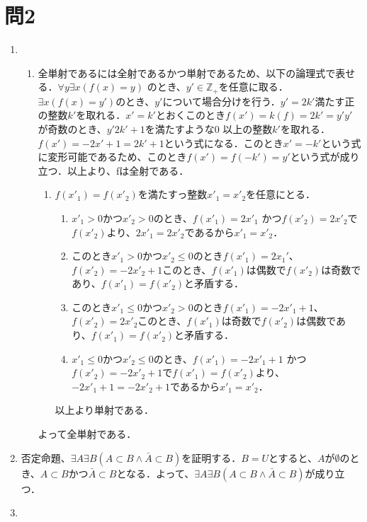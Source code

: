 \documentclass[uplatex]{jsarticle}
\begin{document}
\section{問2}
\begin{enumerate}
	\item 
		\begin{enumerate}
			\item 全単射であるには全射であるかつ単射であるため、以下の論理式で表せる．$\forall y \exists x ( f(x) = y)$ のとき、$y' \in \mathbb{Z}_+$を任意に取る．$\exists x (f(x) = y') $のとき、$y'$について場合分けを行う．$y' = 2k'$満たす正の整数$k'$を取れる．$x' = k'$とおくこのとき$f(x') = k(f) =  2k'= y'$$y'$が奇数のとき、$y' 2k' + 1 $を満たすような0 以上の整数$k'$を取れる．$f(x') = -2x' + 1 = 2k' + 1$という式になる．このとき$x' = -k'$という式に変形可能であるため、このとき$f(x') = f(-k') = y'$という式が成り立つ．以上より、fは全射である．
			\begin{enumerate}
				\item $f(x'_1) = f(x'_2)$を満たすっ整数$x'_1 = x'_2$を任意にとる．
					\begin{enumerate}
						\item $x'_1 > 0$かつ$x'_2>0$のとき、$f(x'_1) = 2x'_1$ かつ$f(x'_2) = 2x'_2$で$f(x'_2)$より、$2x'_1=2x'_2$であるから$x'_1 = x'_2$．
						\item このとき$x'_1 > 0 $かつ$x'_2 \le 0$のとき$f(x'_1) = 2x_1'$、$f(x'_2) = -2x'_2 + 1$このとき、$f(x'_1)$は偶数で$f(x'_2)$は奇数であり、$f(x'_1) = f(x'_2)$と矛盾する．
						\item このとき$x'_1 \le 0 $かつ$x'_2 > 0$のとき$f(x'_1) = -2x'_1 + 1$、$f(x'_2) = 2x'_2$このとき、$f(x'_1)$は奇数で$f(x'_2)$は偶数であり、$f(x'_1) = f(x'_2)$と矛盾する．
						\item $x'_1 \le 0$かつ$x'_2\le0$のとき、$f(x'_1) = -2x'_1 + 1$ かつ$f(x'_2) = -2x'_2 + 1$で$f(x'_1) = f(x'_2)$より、$-2x'_1 + 1 = -2x'_2 + 1$であるから$x'_1 = x'_2$．
					\end{enumerate}
				以上より単射である．
			\end{enumerate}
			よって全単射である．
		\end{enumerate}
	\item 否定命題、$\exists A \exists B(A \subset B \land \bar{A} \subset B)$を証明する．$B = U$とすると、$A$が$\emptyset$のとき、$A \subset B$かつ$\bar{A} \subset B$となる．よって、$\exists A \exists B ( A \subset B \land \bar{A} \subset B)$が成り立つ．
	\item
		\begin{enumerate}

\end{enumerate}
\end{enumerate}
\end{document}

